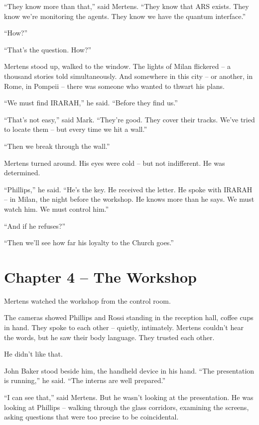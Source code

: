 \documentclass[
]{article}
\begin{document}
\enquote{They know more than that,} said Mertens. \enquote{They know that ARS exists. They know we're monitoring the agents. They know we have the quantum interface.}

\enquote{How?}

\enquote{That's the question. How?}

Mertens stood up, walked to the window. The lights of Milan flickered -- a thousand stories told simultaneously. And somewhere in this city -- or another, in Rome, in Pompeii -- there was someone who wanted to thwart his plans.

\enquote{We must find IRARAH,} he said. \enquote{Before they find us.}

\enquote{That's not easy,} said Mark. \enquote{They're good. They cover their tracks. We've tried to locate them -- but every time we hit a wall.}

\enquote{Then we break through the wall.}

Mertens turned around. His eyes were cold -- but not indifferent. He was determined.

\enquote{Phillips,} he said. \enquote{He's the key. He received the letter. He spoke with IRARAH -- in Milan, the night before the workshop. He knows more than he says. We must watch him. We must control him.}

\enquote{And if he refuses?}

\enquote{Then we'll see how far his loyalty to the Church goes.}

\newpage

\section{Chapter 4 -- The Workshop}

Mertens watched the workshop from the control room.

The cameras showed Phillips and Rossi standing in the reception hall, coffee cups in hand. They spoke to each other -- quietly, intimately. Mertens couldn't hear the words, but he saw their body language. They trusted each other.

He didn't like that.

John Baker stood beside him, the handheld device in his hand. \enquote{The presentation is running,} he said. \enquote{The interns are well prepared.}

\enquote{I can see that,} said Mertens. But he wasn't looking at the presentation. He was looking at Phillips -- walking through the glass corridors, examining the screens, asking questions that were too precise to be coincidental.
\end{document}
